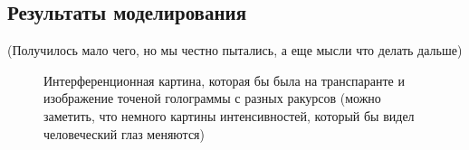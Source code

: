 \documentclass[aps,twocolumn,secnumarabic,balancelastpage,amsmath,amssymb,nofootinbib, floatfix]{revtex4-1}
\begin{document}
\subsection{Результаты моделирования}
(Получилось мало чего, но мы честно пытались, а еще мысли что делать дальше)
\begin{figure}[htbp]
	\centering
	\quad
	\quad
	\quad
	\caption{Интерференционная картина, которая бы была на транспаранте и изображение точеной голограммы с разных ракурсов (можно заметить, что немного картины интенсивностей, который бы видел человеческий глаз меняются)}
	\label{fig:point_hologram}
\end{figure}
\end{document}
